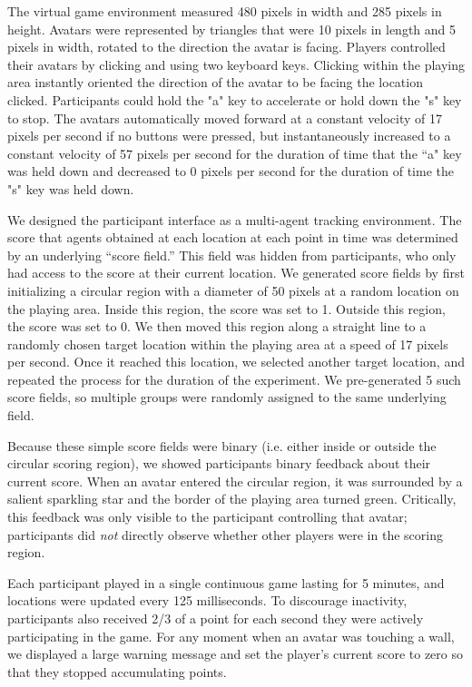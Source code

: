 \documentclass[12pt,letterpaper]{article}
\begin{document}
The virtual game environment measured 480 pixels in width and 285 pixels in height.
Avatars were represented by triangles that were 10 pixels in length and 5 pixels in width, rotated to the direction the avatar is facing. Players controlled their avatars by clicking and using two keyboard keys. 
Clicking within the playing area instantly oriented the direction of the avatar to be facing the location clicked. 
Participants could hold the "a" key to accelerate or hold down the "s" key to stop.  
The avatars automatically moved forward at a constant velocity of 17 pixels per second if no buttons were pressed, but instantaneously increased to a constant velocity of 57 pixels per second for the duration of time that the ``a" key was held down and decreased to 0 pixels per second for the duration of time the "s" key was held down. 

We designed the participant interface as a multi-agent tracking environment.
The score that agents obtained at each location at each point in time was determined by an underlying ``score field.'' 
This field was hidden from participants, who  only had access to the score at their current location. 
We generated score fields by first initializing a circular region with a diameter of 50 pixels at a random location on the playing area. 
Inside this region, the score was set to 1.
Outside this region, the score was set to 0.
We then moved this region along a straight line to a randomly chosen target location within the playing area at a speed of 17 pixels per second.
Once it reached this location, we selected another target location, and repeated the process for the duration of the experiment.
We pre-generated 5 such score fields, so multiple groups were randomly assigned to the same underlying field.  

Because these simple score fields were binary (i.e. either inside or outside the circular scoring region), we showed participants binary feedback about their current score.
When an avatar entered the circular region, it was surrounded by a salient sparkling star and the border of the playing area turned green. 
Critically, this feedback was only visible to the participant controlling that avatar; participants did \emph{not} directly observe whether other players were in the scoring region.

Each participant played in a single
continuous game lasting for 5 minutes, and locations were updated every 125 milliseconds. 
To discourage inactivity, participants also received 2/3 of a point for each second they were actively participating in the game.
For any moment when an avatar was touching a wall, we displayed a large warning message and set the player's current score to zero so that they stopped accumulating points.
\end{document}
